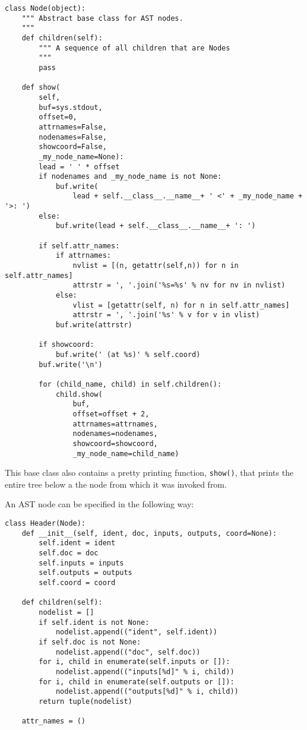 \begin{lstlisting}
class Node(object):
    """ Abstract base class for AST nodes.
    """
    def children(self):
        """ A sequence of all children that are Nodes
        """
        pass

    def show(
        self,
        buf=sys.stdout,
        offset=0,
        attrnames=False,
        nodenames=False,
        showcoord=False,
        _my_node_name=None):
        lead = ' ' * offset
        if nodenames and _my_node_name is not None:
            buf.write(
                lead + self.__class__.__name__+ ' <' + _my_node_name + '>: ')
        else:
            buf.write(lead + self.__class__.__name__+ ': ')

        if self.attr_names:
            if attrnames:
                nvlist = [(n, getattr(self,n)) for n in self.attr_names]
                attrstr = ', '.join('%s=%s' % nv for nv in nvlist)
            else:
                vlist = [getattr(self, n) for n in self.attr_names]
                attrstr = ', '.join('%s' % v for v in vlist)
            buf.write(attrstr)

        if showcoord:
            buf.write(' (at %s)' % self.coord)
        buf.write('\n')

        for (child_name, child) in self.children():
            child.show(
                buf,
                offset=offset + 2,
                attrnames=attrnames,
                nodenames=nodenames,
                showcoord=showcoord,
                _my_node_name=child_name)
\end{lstlisting}

\noindent This base class also contains a pretty printing function,
\texttt{show()}, that prints the entire tree below a the node from
which it was invoked from.

An AST node can be specified in the following way:

\begin{lstlisting}
class Header(Node):
    def __init__(self, ident, doc, inputs, outputs, coord=None):
        self.ident = ident
        self.doc = doc
        self.inputs = inputs
        self.outputs = outputs
        self.coord = coord

    def children(self):
        nodelist = []
        if self.ident is not None:
            nodelist.append(("ident", self.ident))
        if self.doc is not None:
            nodelist.append(("doc", self.doc))
        for i, child in enumerate(self.inputs or []):
            nodelist.append(("inputs[%d]" % i, child))
        for i, child in enumerate(self.outputs or []):
            nodelist.append(("outputs[%d]" % i, child))
        return tuple(nodelist)

    attr_names = ()
\end{lstlisting}

